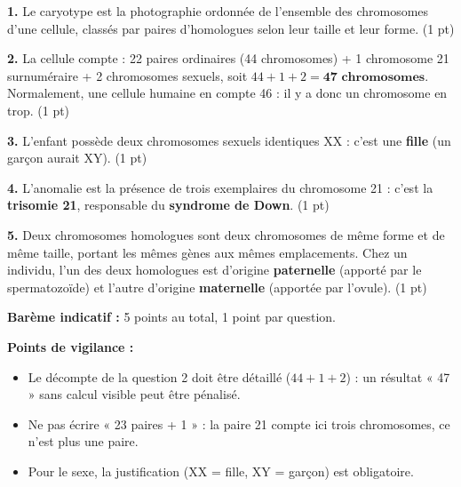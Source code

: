 \documentclass[11pt]{article}
\newcommand{\cle}[1]{{\popxbold\color{popdark}#1}}
\begin{document}
\begin{corrige}
\textbf{1.} Le \cle{caryotype} est la photographie ordonnée de l'ensemble des chromosomes d'une cellule, classés par paires d'homologues selon leur taille et leur forme. \hfill (1 pt)

\textbf{2.} La cellule compte : 22 paires ordinaires (44 chromosomes) + 1 chromosome 21 surnuméraire + 2 chromosomes sexuels, soit $44 + 1 + 2 = \textbf{47 chromosomes}$. Normalement, une cellule humaine en compte 46 : il y a donc un chromosome en trop. \hfill (1 pt)

\textbf{3.} L'enfant possède deux chromosomes sexuels identiques XX : c'est une \textbf{fille} (un garçon aurait XY). \hfill (1 pt)

\textbf{4.} L'anomalie est la présence de trois exemplaires du chromosome 21 : c'est la \textbf{trisomie 21}, responsable du \textbf{syndrome de Down}. \hfill (1 pt)

\textbf{5.} Deux chromosomes homologues sont deux chromosomes de même forme et de même taille, portant les mêmes gènes aux mêmes emplacements. Chez un individu, l'un des deux homologues est d'origine \textbf{paternelle} (apporté par le spermatozoïde) et l'autre d'origine \textbf{maternelle} (apportée par l'ovule). \hfill (1 pt)

\textbf{Barème indicatif :} 5 points au total, 1 point par question.

\textbf{Points de vigilance :}
\begin{itemize}
\item Le décompte de la question 2 doit être détaillé ($44 + 1 + 2$) : un résultat « 47 » sans calcul visible peut être pénalisé.
\item Ne pas écrire « 23 paires + 1 » : la paire 21 compte ici trois chromosomes, ce n'est plus une paire.
\item Pour le sexe, la justification (XX = fille, XY = garçon) est obligatoire.
\end{itemize}
\end{corrige}
\end{document}
